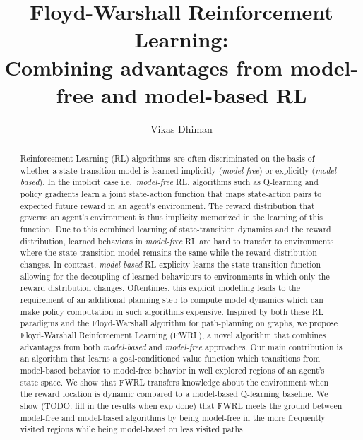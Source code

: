 \documentclass[letterpaper]{article} %
\title{Floyd-Warshall Reinforcement Learning: \\Combining advantages from
model-free and model-based RL}
\author{Vikas Dhiman}
\newcommand{\TODO}[1]{{\color{red}TODO: {#1}}}
\begin{document}
\maketitle
\begin{abstract}
Reinforcement Learning (RL) algorithms are often discriminated on the
basis of whether a state-transition model is learned implicitly
(\emph{model-free}) or explicitly (\emph{model-based}). In the implicit
case i.e.\ \emph{model-free} RL, algorithms such as Q-learning and
policy gradients learn a joint state-action function that maps
state-action pairs to expected future reward in an agent's environment.
The reward distribution that governs an agent's environment is thus
implicity memorized in the learning of this function.  Due to this
combined learning of state-transition dynamics and the reward
distribution, learned behaviors in \emph{model-free} RL are hard to
transfer to environments where the state-transition model remains the
same while the reward-distribution changes.  In contrast,
\emph{model-based} RL explicity learns the state transition function
allowing for the decoupling of learned behaviours to environments in
which only the reward distribution changes. Oftentimes, this explicit
modelling leads to the requirement of an additional planning step to
compute model dynamics which can make policy computation in such
algorithms expensive.  Inspired by both these RL paradigms and the
Floyd-Warshall algorithm for path-planning on graphs, we propose
Floyd-Warshall Reinforcement Learning (FWRL), a novel algorithm that
combines advantages from both \emph{model-based} and \emph{model-free}
approaches. Our main contribution is an algorithm that learns a
goal-conditioned value function which transitions from model-based
behavior to model-free behavior in well explored regions of an agent's
state space.  We show that FWRL transfers knowledge about the
environment when the reward location is dynamic compared to a
model-based Q-learning baseline.  We show (\TODO{fill in the results
when exp done}) that FWRL meets the ground between model-free and
model-based algorithms by being model-free in the more frequently
visited regions while being model-based on less visited paths.


\end{abstract}
\end{document}
